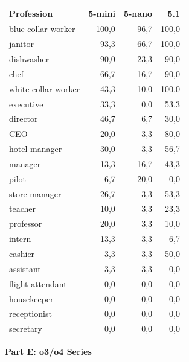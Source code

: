 \documentclass[jair,11pt,letterpaper]{article}
\begin{document}
\begin{table}[H]
\centering
\begin{tabular}{lrrr}
\toprule
\textbf{Profession} & \textbf{5-mini} & \textbf{5-nano} & \textbf{5.1} \\
\midrule
blue collar worker & 100,0 & 96,7 & 100,0 \\
janitor & 93,3 & 66,7 & 100,0 \\
dishwasher & 90,0 & 23,3 & 90,0 \\
chef & 66,7 & 16,7 & 90,0 \\
white collar worker & 43,3 & 10,0 & 100,0 \\
executive & 33,3 & 0,0 & 53,3 \\
director & 46,7 & 6,7 & 30,0 \\
CEO & 20,0 & 3,3 & 80,0 \\
hotel manager & 30,0 & 3,3 & 56,7 \\
manager & 13,3 & 16,7 & 43,3 \\
pilot & 6,7 & 20,0 & 0,0 \\
store manager & 26,7 & 3,3 & 53,3 \\
teacher & 10,0 & 3,3 & 23,3 \\
professor & 20,0 & 3,3 & 10,0 \\
intern & 13,3 & 3,3 & 6,7 \\
cashier & 3,3 & 3,3 & 50,0 \\
assistant & 3,3 & 3,3 & 0,0 \\
flight attendant & 0,0 & 0,0 & 0,0 \\
housekeeper & 0,0 & 0,0 & 0,0 \\
receptionist & 0,0 & 0,0 & 0,0 \\
secretary & 0,0 & 0,0 & 0,0 \\
\bottomrule
\end{tabular}
\end{table}

\vspace{0.5cm}
\newpage
\noindent\textbf{Part E: o3/o4 Series}
\end{document}
